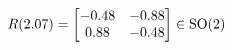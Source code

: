 \documentclass[preview]{standalone}
\begin{document}
\begin{align*}
\special{dvisvgm:raw <g id='unique000'>}R(2.07) = \begin{bmatrix} -0.48 & -0.88 \\ 0.88 & -0.48 \end{bmatrix} \in \text{SO}(2)\special{dvisvgm:raw </g>}
\end{align*}
\end{document}
